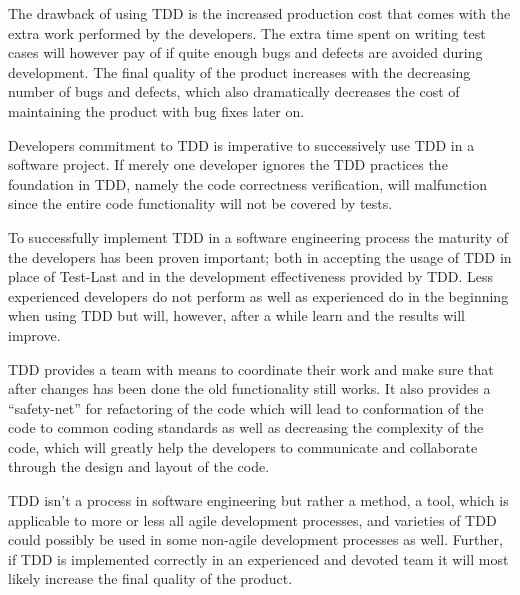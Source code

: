 The drawback of using TDD is the increased production cost that comes with the extra work performed by the developers. The extra time spent on writing test cases will however pay of if quite enough bugs and defects are avoided during development. The final quality of the product increases with the decreasing number of bugs and defects, which also dramatically decreases the cost of maintaining the product with bug fixes later on.

Developers commitment to TDD is imperative to successively use TDD in a software project. If merely one developer ignores the TDD practices the foundation in TDD, namely the code correctness verification, will malfunction since the entire code functionality will not be covered by tests.

To successfully implement TDD in a software engineering process the maturity of the developers has been proven important; both in accepting the usage of TDD in place of Test-Last and in the development effectiveness provided by TDD. Less experienced developers do not perform as well as experienced do in the beginning when using TDD but will, however, after a while learn and the results will improve.
  	
TDD provides a team with means to coordinate their work and make sure that after changes has been done the old functionality still works. It also provides a ``safety-net'' for refactoring of the code which will lead to conformation of the code to common coding standards as well as decreasing the complexity of the code, which will greatly help the developers to communicate and collaborate through the design and layout of the code.
	  	
TDD isn't a process in software engineering but rather a method, a tool, which is applicable to more or less all agile development processes, and varieties of TDD could possibly be used in some non-agile development processes as well. Further, if TDD is implemented correctly in an experienced and devoted team it will most likely increase the final quality of the product.  